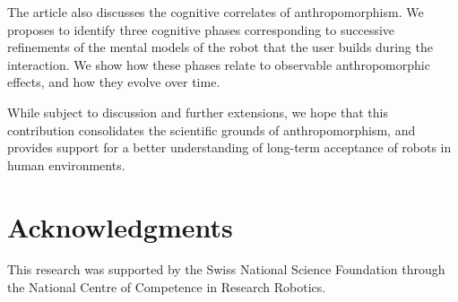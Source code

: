 \documentclass{frontiersSCNS} %
\begin{document}
The article also discusses the cognitive correlates of anthropomorphism. We
proposes to identify three cognitive phases corresponding to successive
refinements of the mental models of the robot that the user builds during the
interaction. We show how these phases relate to observable anthropomorphic
effects, and how they evolve over time.

While subject to discussion and further extensions, we hope that this
contribution consolidates the scientific grounds of anthropomorphism, and
provides support for a better understanding of long-term acceptance of robots in
human environments.


\section*{Acknowledgments}

This research was supported by the Swiss National Science Foundation through the National Centre of Competence in Research Robotics.


\end{document}
